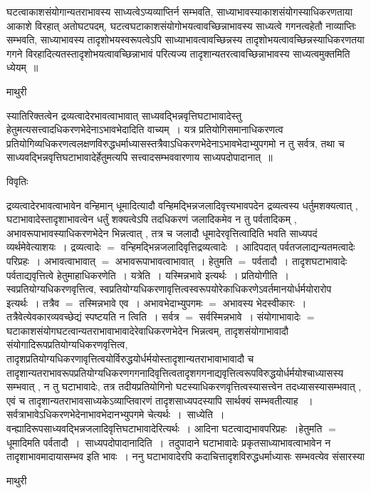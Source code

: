 \documentclass[10pt, openany]{book}
\begin{document}
{घटत्वाकाशसंयोगान्यतराभावस्य साध्यत्वेऽप्यव्याप्तिर्न सम्भवति, साध्याभावस्याकाशसंयोगस्याधिकरणताया आकाशे विरहात् अतोघटपदम्, घटत्वघटाकाशसंयोगोभयत्वावच्छिन्नाभावस्य साध्यत्वे गगनत्वहेतौ नाव्याप्तिः सम्भवति, साध्याभावस्य तादृशोभयस्वरूपत्वेऽपि साध्याभावत्वावच्छिन्नस्य तादृशोभयत्वावच्छिन्नस्याधिकरणतया गगने विरहादित्यतस्तादृशोभयत्वावच्छिन्नाभावं परित्यज्य तादृशान्यतरत्वावच्छिन्नाभावस्य साध्यत्वमुक्तमिति ध्येयम्~॥
\newpage
\lfoot{}
\begin{center}  माथुरी  \end{center} {\la
स्यातिरिक्तत्वेन द्रव्यत्वादेरभावत्वाभावात् साध्यवद्भिन्नवृत्तिघटाभावादेस्तु हेतुमत्यसत्त्वादधिकरणभेदेनाऽभावभेदादिति वाच्यम्~। यत्र प्रतियोगिसमानाधिकरणत्व प्रतियोगिव्यधिकरणत्वलक्षणविरुद्धधर्माध्यासस्तत्रैवाऽधिकरणभेदेनाऽभावभेदाभ्युपगमो न तु सर्वत्र, तथा च साध्यवद्भिन्नवृत्तिघटाभावादेर्हेतुमत्यपि सत्त्वादसम्भववारणाय साध्यपदोपादानात्~॥}
\begin{center}     विवृतिः \end{center}
द्रव्यत्वादेरभावत्वाभावेन वन्हिमान् धूमादित्यादौ वन्हिमद्भिन्नजलादिवृत्त्यभावपदेन द्रव्यत्वस्य धर्तुमशक्यत्वात् , घटाभावादेस्तादृशाभावत्वेन धर्तुं शक्यत्वेऽपि तदधिकरणं जलादिकमेव न तु पर्वतादिकम् , अभावरूपाभावस्याधिकरणभेदेन भिन्नत्वात् , तत्र च जलादौ धूमादेरवृत्तित्वादिति भवति साध्यपदं व्यर्थमेवेत्याशयः~। द्रव्यत्वादेः $=$ वन्हिमद्भिन्नजलादिवृत्तिद्रव्यत्वादेः~। आदिपदात् पर्वतजलाद्यन्यतमत्वादेः परिप्रहः~। अभावत्वाभावात् $=$ अभावरूपाभावत्वाभावात्~। हेतुमति $=$ पर्वतादौ~। तादृशघटाभावादेः पर्वताद्यवृत्तित्वे हेतुमाहाधिकरणेति~। यत्रेति~। यस्मिन्नभावे इत्यर्थः~। प्रतियोगीति~। स्वप्रतियोग्यधिकरणवृत्तित्व, स्वप्रतियोग्यधिकरणावृत्तित्वस्वरूपयोरेकाधिकरणेऽवर्तमानयोर्धर्मयोरारोप इत्यर्थः~। तत्रैव $=$ तस्मिन्नभावे एव~। अभावभेदाभ्युपगमः $=$ अभावस्य भेदस्वीकारः~।
तत्रैवेत्येवकारव्यवच्छेद्यं स्पष्टयति {\qt न त्विति~}। सर्वत्र $=$  सर्वस्मिन्नभावे~। संयोगाभावादेः $=$ घटाकाशसंयोगघटत्वान्यतराभावाभावादेरेवाधिकरणभेदेन भिन्नत्वम्,
तादृशसंयोगाभावादौ संयोगादिरूपप्रतियोग्यधिकरणवृत्तित्व, तादृशप्रतियोग्यधिकरणावृत्तित्वयोर्विरुद्धयोर्धर्मयोस्तादृशान्यतराभावाभावादौ च
तादृशान्यतराभावरूपप्रतियोग्यधिकरणगगनादिवृत्तित्वतादृशगगनाद्यवृत्तित्वरूपविरुद्धयोर्धर्मयोश्चाध्यासस्य सम्भवात् , न तु घटाभावादेः, तत्र तदीयप्रतियोगिनो
घटस्याधिकरणवृत्तित्वस्यासत्त्वेन तदध्यासस्यासम्भवात् , एवं च तादृशान्यतराभावसाध्यकेऽव्याप्तिवारणं तादृशसाध्यपदस्यापि सार्थक्यं सम्भवतीत्याह  ~। सर्वत्राभावेऽधिकरणभेदेनाभावभेदानभ्युपगमे चेत्यर्थः~।~{\la साध्येति~।} वन्ह्यादिरूपसाध्यवद्भिन्नजलादिवृत्तिघटाभावादेरित्यर्थः~। आदिना घटत्वाद्यभावपरिप्रहः~।हेतुमति $=$ धूमादिमति पर्वतादौ~।~{\la साध्यपदोपादानादिति~।}~तदुपादाने घटाभावादेः प्रकृतसाध्याभावत्वाभावेन न तादृशाभावमादायासम्भव इति भावः~। ननु घटाभावादेरपि कदाचित्तादृशविरुद्धधर्माध्यासः सम्भवत्येव संसारस्या
\newpage
\begin{center}  माथुरी  \end{center}

}
\end{document}
